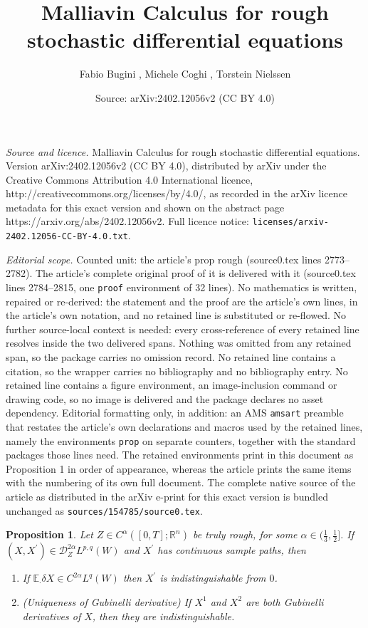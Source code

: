 \documentclass[10pt,a4paper]{amsart}
\title{Malliavin Calculus for rough stochastic differential equations}
\author{Fabio Bugini , Michele Coghi , Torstein Nielssen}
\date{Source: arXiv:2402.12056v2 (CC BY 4.0)}
\newtheorem{prop}{Proposition}
\newcommand{\R}{\mathbb{R}}
\begin{document}
\maketitle

\noindent\emph{Source and licence.} Malliavin Calculus for rough stochastic differential equations. Version arXiv:2402.12056v2 (CC BY 4.0), distributed by arXiv under the Creative Commons Attribution 4.0 International licence, http://creativecommons.org/licenses/by/4.0/, as recorded in the arXiv licence metadata for this exact version and shown on the abstract page https://arxiv.org/abs/2402.12056v2. Full licence notice: \texttt{licenses/arxiv-2402.12056-CC-BY-4.0.txt}.\par\smallskip

\noindent\textit{Editorial scope.} Counted unit: the article's prop rough (source0.tex lines 2773--2782). The article's complete original proof of it is delivered with it (source0.tex lines 2784--2815, one \texttt{proof} environment of 32 lines). No mathematics is written, repaired or re-derived: the statement and the proof are the article's own lines, in the article's own notation, and no retained line is substituted or re-flowed.  No further source-local context is needed: every cross-reference of every retained line resolves inside the two delivered spans.  Nothing was omitted from any retained span, so the package carries no omission record.  No retained line contains a citation, so the wrapper carries no bibliography and no bibliography entry.  No retained line contains a figure environment, an image-inclusion command or drawing code, so no image is delivered and the package declares no asset dependency.  Editorial formatting only, in addition: an AMS \texttt{amsart} preamble that restates the article's own declarations and macros used by the retained lines, namely the environments \texttt{prop} on separate counters, together with the standard packages those lines need.  The retained environments print in this document as Proposition 1 in order of appearance, whereas the article prints the same items with the numbering of its own full document.  The complete native source of the article as distributed in the arXiv e-print for this exact version is bundled unchanged as \texttt{sources/154785/source0.tex}.
\begin{prop}
    \label{prop: uniqueness truly rough}
    Let $Z \in C^\alpha([0,T];\R^n)$
    be truly rough, for some $\alpha \in (\frac{1}{3},\frac{1}{2}]$. If \linebreak $(X,X^{\prime}) \in \mathscr{D}_{Z}^{2\alpha}L^{p,q}(W)$ and $X^{\prime}$ has continuous sample paths, then
    \begin{enumerate}
        \item If $\mathbb{E}_{\cdot}\delta X \in C^{2\alpha}L^q(W)$ then $X^{\prime}$ is indistinguishable from $0$.
        \item \textit{(Uniqueness of Gubinelli derivative)} If $X^1$ and $X^2$ are both Gubinelli derivatives of $X$, then they are indistinguishable.
    \end{enumerate}
\end{prop}
\end{document}
